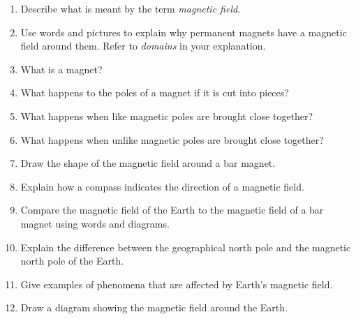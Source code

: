       \label{m37830*id129746}\begin{enumerate}[noitemsep, label=\textbf{\arabic*}. ] 
            \label{m37830*uid28}\item Describe what is meant by the term \textsl{magnetic field}.\newline
            
\label{m37830*uid29}\item Use words and pictures to explain why permanent magnets have a magnetic field around them. Refer to \textsl{domains} in your explanation.\newline
            
\label{m37830*uid30}\item What is a magnet?\newline
            
\label{m37830*uid31}\item What happens to the poles of a magnet if it is cut into pieces?\newline
            
\label{m37830*uid32}\item What happens when like magnetic poles are brought close together?\newline
            
\label{m37830*uid33}\item What happens when unlike magnetic poles are brought close together?\newline
            
\label{m37830*uid34}\item Draw the shape of the magnetic field around a bar magnet.\newline
            
\label{m37830*uid35}\item Explain how a compass indicates the direction of a magnetic field.\newline
            
\label{m37830*uid36}\item Compare the magnetic field of the Earth to the magnetic field of a bar magnet using words and diagrams.\newline
            
\label{m37830*uid37}\item Explain the difference between the geographical north pole and the magnetic north pole of the Earth.\newline
            
\label{m37830*uid38}\item Give examples of phenomena that are affected by Earth's magnetic field.\newline
            
\label{m37830*uid39}\item Draw a diagram showing the magnetic field around the Earth.\newline
            
\end{enumerate}
        
